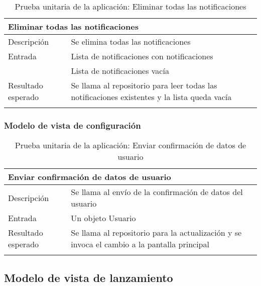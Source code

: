 \vspace{-20pt}
\begin{longtable}{|p{} p{}|}
    \hline
    \multicolumn{2}{|l|}{\textbf{Eliminar todas las notificaciones}} \\ \hline 
    Descripción                 & Se elimina todas las notificaciones \\ \hline
    Entrada                     & Lista de notificaciones con notificaciones \\
                                & Lista de notificaciones vacía \\ \hline
    Resultado esperado          & Se llama al repositorio para leer todas las notificaciones existentes y la lista queda vacía \\ \hline
    \caption{Prueba unitaria de la aplicación: Eliminar todas las notificaciones}
    \label{cp:u:app:eliminar_todas_notificaciones}
\end{longtable}

\vspace{-30pt}
\subsubsection{Modelo de vista de configuración}

\vspace{-10pt}
\begin{longtable}{|p{} p{}|}
    \hline
    \multicolumn{2}{|l|}{\textbf{Enviar confirmación de datos de usuario}} \\ \hline 
    Descripción                 & Se llama al envío de la confirmación de datos del usuario \\ \hline
    Entrada                     & Un objeto Usuario \\ \hline
    Resultado esperado          & Se llama al repositorio para la actualización y se invoca el cambio a la pantalla principal \\ \hline
    \caption{Prueba unitaria de la aplicación: Enviar confirmación de datos de usuario}
    \label{cp:u:app:enviar_confirmacion_datos_usuario}
\end{longtable}

\subsection{Modelo de vista de lanzamiento}

